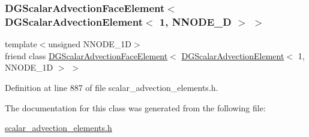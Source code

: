 \subsubsection{\texorpdfstring{D\+G\+Scalar\+Advection\+Face\+Element$<$ D\+G\+Scalar\+Advection\+Element$<$ 1, N\+N\+O\+D\+E\+\_\+D $>$ $>$}{DGScalarAdvectionFaceElement< DGScalarAdvectionElement< 1, NNODE\_1D > >}}
{\footnotesize\ttfamily template$<$unsigned N\+N\+O\+D\+E\+\_\+1D$>$ \\
friend class \hyperlink{classoomph_1_1DGScalarAdvectionFaceElement}{D\+G\+Scalar\+Advection\+Face\+Element}$<$ \hyperlink{classoomph_1_1DGScalarAdvectionElement}{D\+G\+Scalar\+Advection\+Element}$<$ 1, N\+N\+O\+D\+E\+\_\+1D $>$ $>$\hspace{0.3cm}{\ttfamily [friend]}}



Definition at line 887 of file scalar\+\_\+advection\+\_\+elements.\+h.



The documentation for this class was generated from the following file\+:\begin{DoxyCompactItemize}
\item 
\hyperlink{scalar__advection__elements_8h}{scalar\+\_\+advection\+\_\+elements.\+h}\end{DoxyCompactItemize}
